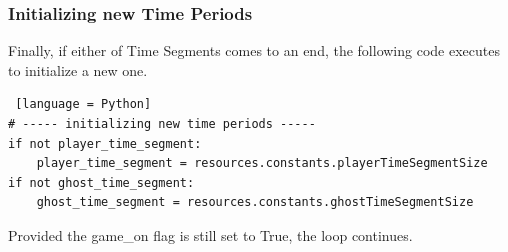 \documentclass[11pt,a4paper]{report}
\begin{document}
				\subsubsection{Initializing new Time Periods}
					Finally, if either of Time Segments comes to an end, the following code executes to initialize a new one.
					\begin{lstlisting} [language = Python]
# ----- initializing new time periods -----
if not player_time_segment:
	player_time_segment = resources.constants.playerTimeSegmentSize
if not ghost_time_segment:
	ghost_time_segment = resources.constants.ghostTimeSegmentSize
					\end{lstlisting}
				Provided the game\_on flag is still set to True, the loop continues.
				\linebreak
				
\end{document}
